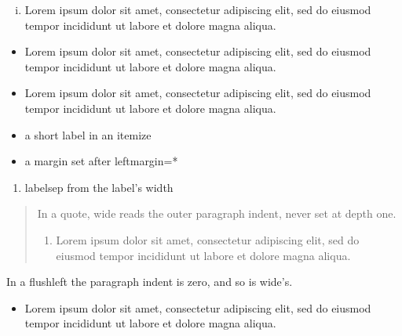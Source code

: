 \documentclass{article}
\begin{document}
\begin{enumerate}[i.]
\item Lorem ipsum dolor sit amet, consectetur adipiscing elit, sed do eiusmod tempor incididunt ut labore et dolore magna aliqua.
\end{enumerate}
\begin{itemize}[label=--, labelindent=1em, leftmargin=*, itemindent=1em]
\item Lorem ipsum dolor sit amet, consectetur adipiscing elit, sed do eiusmod tempor incididunt ut labore et dolore magna aliqua.
\end{itemize}
\begin{itemize}[label=$\star$, labelwidth=!, leftmargin=3em]
\item Lorem ipsum dolor sit amet, consectetur adipiscing elit, sed do eiusmod tempor incididunt ut labore et dolore magna aliqua.
\end{itemize}
\begin{itemize}[+]
\item a short label in an itemize
\end{itemize}
\begin{itemize}[leftmargin=*, leftmargin=3em]
\item a margin set after leftmargin=*
\end{itemize}
\begin{enumerate}[labelsep=*, leftmargin=4em]
\item labelsep from the label's width
\end{enumerate}
\begin{quote}
In a quote, wide reads the outer paragraph indent, never set at depth one.
\begin{enumerate}[wide]
\item Lorem ipsum dolor sit amet, consectetur adipiscing elit, sed do eiusmod tempor incididunt ut labore et dolore magna aliqua.
\end{enumerate}
\end{quote}
\begin{flushleft}
In a flushleft the paragraph indent is zero, and so is wide's.
\begin{itemize}[wide]
\item Lorem ipsum dolor sit amet, consectetur adipiscing elit, sed do eiusmod tempor incididunt ut labore et dolore magna aliqua.
\end{itemize}
\end{flushleft}
\end{document}
